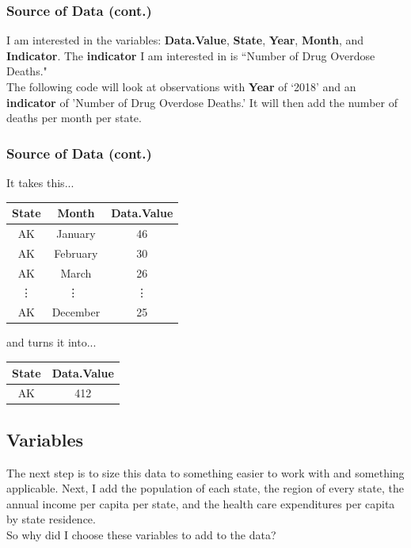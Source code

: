\documentclass[10pt]{beamer}
\begin{document}
\begin{frame}
\frametitle{Source of Data (cont.)}
	I am interested in the variables: {\bf Data.Value}, {\bf State}, {\bf Year}, {\bf Month}, and {\bf Indicator}. The {\bf indicator} I am interested in is ``Number of Drug Overdose Deaths."\\[2mm]
	The following code will look at observations with {\bf Year} of `2018' and an {\bf indicator} of 'Number of Drug Overdose Deaths.' It will then add the number of deaths per month per state.
	
\end{frame}

\begin{frame}
\frametitle{Source of Data (cont.)}
	It takes this...\\
		\begin{center}
		\begin{tabular}{|c|c|c|}
			\hline
			State & Month & Data.Value\\
			\hline
			AK & January & 46\\
			\hline
			AK & February & 30\\
			\hline
			AK & March & 26\\
			\hline
			\vdots & \vdots\ & \vdots\\
			\hline
			AK & December & 25\\
			\hline
		\end{tabular}
		\end{center}
	and turns it into...
		\begin{center}
		\begin{tabular}{|c|c|}
			\hline
			State & Data.Value\\
			\hline
			AK & 412\\
			\hline
		\end{tabular}
		\end{center}
\end{frame}

\subsection{Variables}
\begin{frame}
	The next step is to size this data to something easier to work with and something applicable. Next, I add the population of each state\cite{state}, the region of every state\cite{region}, the annual income per capita per state\cite{income}, and the health care expenditures per capita by state residence\cite{health}.\\[4mm]
	So why did I choose these variables to add to the data?
\end{frame}
\end{document}
